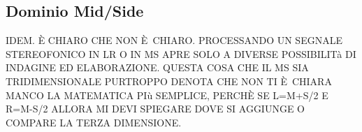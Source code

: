 \subsection{Dominio Mid/Side}

IDEM. È CHIARO CHE NON È CHIARO. PROCESSANDO UN SEGNALE STEREOFONICO IN LR O IN MS APRE SOLO A DIVERSE POSSIBILITà DI INDAGINE ED ELABORAZIONE. QUESTA COSA CHE IL MS SIA TRIDIMENSIONALE PURTROPPO DENOTA CHE NON TI È CHIARA MANCO LA MATEMATICA PIù SEMPLICE, PERCHÈ SE L=M+S/2 E R=M-S/2 ALLORA MI DEVI SPIEGARE DOVE SI AGGIUNGE O COMPARE LA TERZA DIMENSIONE.


